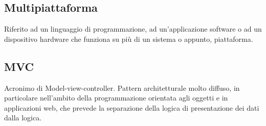 \subsection*{Multipiattaforma}
Riferito ad un linguaggio di programmazione, ad un'applicazione software o ad un dispositivo hardware che funziona su più di un sistema o appunto, piattaforma.

\subsection*{MVC}
Acronimo di Model-view-controller. Pattern architetturale molto diffuso, in particolare nell'ambito della programmazione orientata agli oggetti e in applicazioni web, che prevede la separazione della logica di presentazione dei dati dalla logica.